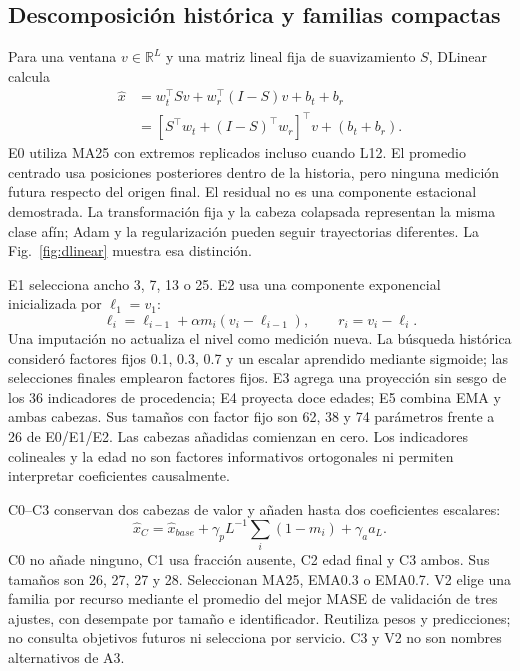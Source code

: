 \subsection{Descomposición histórica y familias compactas}
Para una ventana $ v\in\mathbb R^L $ y una matriz lineal fija de suavizamiento $ S $, DLinear calcula
\begin{align}
\widehat x&=w_t^\top Sv+w_r^\top(I-S)v+b_t+b_r\\
&=[S^\top w_t+(I-S)^\top w_r]^\top v+(b_t+b_r).
\end{align}
E0 utiliza MA25 con extremos replicados incluso cuando L12. El promedio centrado usa posiciones posteriores dentro de la historia, pero ninguna medición futura respecto del origen final. El residual no es una componente estacional demostrada. La transformación fija y la cabeza colapsada representan la misma clase afín; Adam y la regularización pueden seguir trayectorias diferentes. La Fig.~\ref{fig:dlinear} muestra esa distinción.

E1 selecciona ancho 3, 7, 13 o 25. E2 usa una componente exponencial inicializada por $\ell_1=v_1$:
\begin{equation}
\ell_i=\ell_{i-1}+\alpha m_i(v_i-\ell_{i-1}),\qquad r_i=v_i-\ell_i.
\end{equation}
Una imputación no actualiza el nivel como medición nueva. La búsqueda histórica consideró factores fijos 0.1, 0.3, 0.7 y un escalar aprendido mediante sigmoide; las selecciones finales emplearon factores fijos. E3 agrega una proyección sin sesgo de los 36 indicadores de procedencia; E4 proyecta doce edades; E5 combina EMA y ambas cabezas. Sus tamaños con factor fijo son 62, 38 y 74 parámetros frente a 26 de E0/E1/E2. Las cabezas añadidas comienzan en cero. Los indicadores colineales y la edad no son factores informativos ortogonales ni permiten interpretar coeficientes causalmente.

C0--C3 conservan dos cabezas de valor y añaden hasta dos coeficientes escalares:
\begin{equation}
\widehat x_C=\widehat x_{base}+\gamma_p L^{-1}\sum_i(1-m_i)+\gamma_a a_L.
\end{equation}
C0 no añade ninguno, C1 usa fracción ausente, C2 edad final y C3 ambos. Sus tamaños son 26, 27, 27 y 28. Seleccionan MA25, EMA0.3 o EMA0.7. V2 elige una familia por recurso mediante el promedio del mejor MASE de validación de tres ajustes, con desempate por tamaño e identificador. Reutiliza pesos y predicciones; no consulta objetivos futuros ni selecciona por servicio. C3 y V2 no son nombres alternativos de A3.

